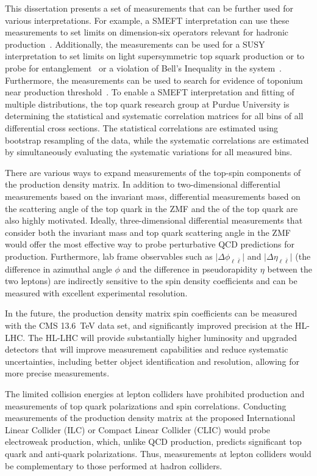\begin{refsection}
This dissertation presents a set of measurements that can be further used for various interpretations. 
For example, a SMEFT interpretation can use these measurements to set limits on dimension-six operators relevant for hadronic \ttbar production~\cite{Sirunyan:2681777}. 
Additionally, the measurements can be used for a SUSY interpretation to set limits on light supersymmetric top squark production or to probe for entanglement~\cite{Afik_2021} or a violation of Bell's Inequality in the \ttbar system~\cite{Aguilar_Saavedra_2022}. 
Furthermore, the measurements can be used to search for evidence of toponium near \ttbar production threshold~\cite{PhysRevD.104.034023}. 
To enable a SMEFT interpretation and fitting of multiple distributions, the top quark research group at Purdue University is determining the statistical and systematic correlation matrices for all bins of all differential cross sections. 
The statistical correlations are estimated using bootstrap resampling of the data, while the systematic correlations are estimated by simultaneously evaluating the systematic variations for all measured bins.

There are various ways to expand measurements of the top-spin components of the \ttbar production density matrix. 
In addition to two-dimensional differential measurements based on the \ttbar invariant mass, differential measurements based on the scattering angle of the top quark in the \ttbar ZMF and the \pT of the top quark are also highly motivated. 
Ideally, three-dimensional differential measurements that consider both the \ttbar invariant mass and top quark scattering angle in the \ttbar ZMF would offer the most effective way to probe perturbative QCD predictions for \ttbar production.
Furthermore, lab frame observables such as $\vert \Delta\phi_{\ell\bar{\ell}} \vert$ and $\vert \Delta\eta_{\ell\bar{\ell}} \vert$ (the difference in azimuthal angle $\phi$ and the difference in pseudorapidity $\eta$ between the two leptons) are indirectly sensitive to the spin density coefficients and can be measured with excellent experimental resolution.

In the future, the \ttbar production density matrix spin coefficients can be measured with the CMS \SI{13.6}{\TeV} data set, and significantly improved precision at the HL-LHC.
The HL-LHC will provide substantially higher luminosity and upgraded detectors that will improve measurement capabilities and reduce systematic uncertainties, including better object identification and resolution, allowing for more precise measurements.

The limited collision energies at lepton colliders have prohibited \ttbar production and measurements of top quark polarizations and \ttbar spin correlations. 
Conducting measurements of the \ttbar production density matrix at the proposed International Linear Collider (ILC) or Compact Linear Collider (CLIC) would probe electroweak \ttbar production, which, unlike QCD production, predicts significant top quark and anti-quark polarizations. 
Thus, measurements at lepton colliders would be complementary to those performed at hadron colliders.

\clearpage
\printbibliography[heading=subbibliography,resetnumbers=true]
\end{refsection}